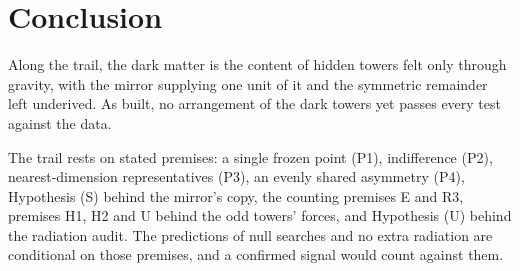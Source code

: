 \documentclass[11pt]{article}
\theoremstyle{definition}
\theoremstyle{plain}
\begin{document}
\section*{Conclusion}
Along the trail, the dark matter is the content of hidden towers felt only through gravity, with the mirror supplying one unit of it and the symmetric remainder left underived. As built, no arrangement of the dark towers yet passes every test against the data.

The trail rests on stated premises: a single frozen point (P1), indifference (P2), nearest-dimension representatives (P3), an evenly shared asymmetry (P4), Hypothesis (S) behind the mirror's copy, the counting premises E and R3, premises H1, H2 and U behind the odd towers' forces, and Hypothesis (U) behind the radiation audit. The predictions of null searches and no extra radiation are conditional on those premises, and a confirmed signal would count against them.
\end{document}
